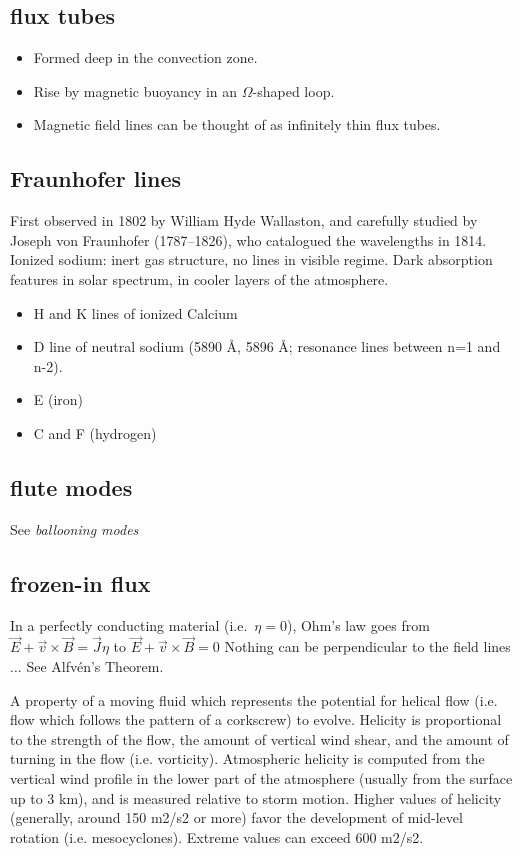 \documentclass{article}
\begin{document}
\subsection{flux tubes}
    \begin{itemize}
        \item Formed deep in the convection zone.
        \item Rise by magnetic buoyancy in an $\Omega$-shaped loop.
        \item Magnetic field lines can be thought of as infinitely
          thin flux tubes.
    \end{itemize}

\subsection{Fraunhofer lines}
First observed in 1802 by William Hyde Wallaston, and carefully
studied by Joseph von Fraunhofer (1787--1826), who catalogued
the wavelengths in 1814. Ionized sodium: inert gas structure,
no lines in visible regime. Dark absorption features in solar
spectrum, in cooler layers of the atmosphere.
\begin{itemize}
    \item H and K lines of ionized Calcium
    \item D line of neutral sodium (5890 \AA{}, 5896 \AA{};
        resonance lines between n=1 and n-2).
    \item E (iron)
    \item C and F (hydrogen)
\end{itemize}

\subsection{flute modes}
See \emph{ballooning modes}

\subsection{frozen-in flux}
In a perfectly conducting material (i.e.\ $\eta = 0$),
Ohm's law goes from
$ \vec{E} + \vec{v} \times \vec{B} = \vec{J}\eta $ to
$ \vec{E} + \vec{v} \times \vec{B} = 0 $
Nothing can be perpendicular to the field lines $\ldots$
See Alfv\'en's Theorem.

A property of a moving fluid which represents the potential for helical flow
(i.e. flow which follows the pattern of a corkscrew) to evolve. Helicity is
proportional to the strength of the flow, the amount of vertical wind shear,
and the amount of turning in the flow (i.e. vorticity). Atmospheric helicity is
computed from the vertical wind profile in the lower part of the atmosphere
(usually from the surface up to 3 km), and is measured relative to storm
motion. Higher values of helicity (generally, around 150 m2/s2 or more) favor
the development of mid-level rotation (i.e. mesocyclones). Extreme values can
exceed 600 m2/s2.
\end{document}
